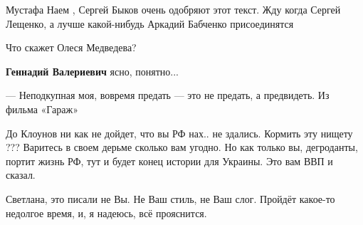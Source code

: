 \begin{itemize}
 
Мустафа Наем , Сергей Быков очень одобряют этот текст. Жду когда Сергей Лещенко, а лучше какой-нибудь Аркадий Бабченко присоединятся

 
Что скажет Олеся Медведева?

\begin{itemize}
 
\textbf{Геннадий Валериевич} ясно, понятно...
\end{itemize}

 
— Неподкупная моя, вовремя предать — это не предать, а предвидеть.
Из фильма «Гараж»

 

До Клоунов ни как не дойдет, что вы РФ нах.. не здались. Кормить эту нищету ???
Варитесь в своем дерьме сколько вам угодно. Но как только вы, дегроданты,
портит жизнь РФ, тут и будет конец истории для Украины. Это вам ВВП и сказал.


Светлана, это писали не Вы. Не Ваш стиль, не Ваш слог. Пройдёт какое-то
недолгое время, и, я надеюсь, всё прояснится.


\end{itemize}
